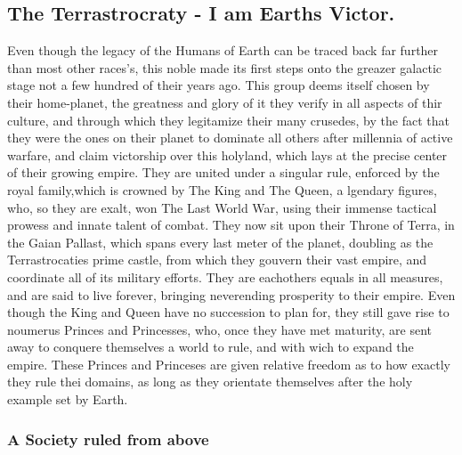 \documentclass[a4paper,12pt]{book}
\begin{document}
\subsection{The Terrastrocraty -  I am Earths Victor.}
Even though the legacy of the Humans of Earth can be traced back far further than most other races's, this noble made its first steps onto the greazer galactic stage not a few hundred of their years ago. This group deems itself chosen by their home-planet, the greatness and glory of it they verify in all aspects of thir culture, and through which they legitamize their many crusedes, by the fact that they were the ones on their planet to dominate all others after millennia of active warfare, and claim victorship over this holyland, which lays at the precise center of their growing empire. They are united under a singular rule, enforced by the royal family,which is crowned by The King and The Queen, a lgendary figures, who, so they are exalt, won The Last World War, using their immense tactical prowess and innate talent of combat. They now sit upon their Throne of Terra, in the Gaian Pallast, which spans every last meter of the planet, doubling as the Terrastrocaties prime castle, from which they gouvern their vast empire, and coordinate all of its military efforts. They are eachothers equals in all  measures, and are said to live forever, bringing neverending prosperity to their empire. Even though the King and Queen have no succession to plan for, they still gave rise to noumerus Princes and Princesses, who, once they have met maturity, are sent away to conquere themselves a world to rule, and with wich to expand the empire. These Princes and Princeses are given relative freedom as to how exactly they rule thei domains, as long as they orientate themselves after the holy example set by Earth. \\

\subsubsection*{A Society ruled from above}
\end{document}
